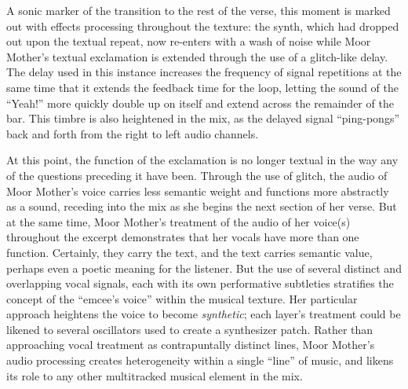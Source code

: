 A sonic marker of the transition to the rest of the verse, this moment is marked out with effects 
processing throughout the texture: the synth, which had dropped out upon the textual repeat, now
re-enters with a wash of noise while Moor Mother's textual exclamation is extended through the 
use of a glitch-like delay. The delay used in this instance increases the frequency of signal 
repetitions at the same time that it extends the feedback time for the loop, letting the sound
of the ``Yeah!'' more quickly double up on itself and extend across the remainder of the bar. This
timbre is also heightened in the mix, as the delayed signal ``ping-pongs'' back and forth from 
the right to left audio channels.

At this point, the function of the exclamation is no longer textual in the way any of the questions
preceding it have been. Through the use of glitch, the audio of Moor Mother's voice carries less 
semantic weight and functions more abstractly as a sound, receding into the mix as she begins the
next section of her verse. But at the same time, Moor Mother's treatment of the audio of her voice(s)
throughout the excerpt demonstrates that her vocals have more than one function. Certainly, they carry
the text, and the text carries semantic value, perhaps even a poetic meaning for the listener. But the
use of several distinct and overlapping vocal signals, each with its own performative subtleties 
stratifies the concept of the ``emcee's voice'' within the musical texture. Her particular approach
heightens the voice to become \emph{synthetic}; each layer's treatment could be likened to several
oscillators used to create a synthesizer patch. Rather than approaching vocal treatment as 
contrapuntally distinct lines, Moor Mother's audio processing creates heterogeneity within a single
``line'' of music, and likens its role to any other multitracked musical element in the mix.